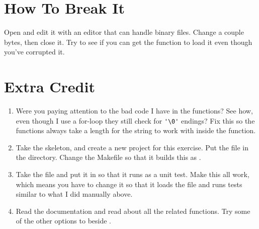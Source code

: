 \section{How To Break It}

Open  and edit it with an editor that can handle
binary files.  Change a couple bytes, then close it.  Try to see
if you can get the  function to load it even though
you've corrupted it.

\section{Extra Credit}

\begin{enumerate}
\item Were you paying attention to the bad code I have in the  functions?
    See how, even though I use a for-loop they still check for \verb|'\0'|
    endings?  Fix this so the functions always take a length for the
    string to work with inside the function.
\item Take the  skeleton, and create a new project
    for this exercise.  Put the  file in the 
    directory.  Change the Makefile so that it builds this as .
\item Take the  file and put it in  so
    that it runs as a unit test.  Make this all work, which means you have to
    change it so that it loads the  file and runs
    tests similar to what I did manually above.
\item Read the  documentation and read about all the
    related functions.  Try some of the other options to 
    beside .
\end{enumerate}

